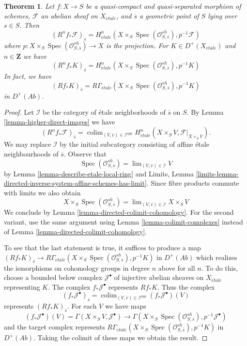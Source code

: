 \documentclass[10pt,a4paper]{amsart}
\theoremstyle{plain}
\newtheorem{theorem}[subsection]{Theorem}
\theoremstyle{definition}
\theoremstyle{remark}
\numberwithin{equation}{subsection}
\def\lim{\mathop{\mathrm{lim}}\nolimits}
\def\colim{\mathop{\mathrm{colim}}\nolimits}
\def\Spec{\mathop{\mathrm{Spec}}}
\def\etale{{\acute{e}tale}}
\begin{document}
\begin{theorem}
\label{theorem-higher-direct-images}
Let $f: X \to S$ be a quasi-compact and quasi-separated morphism of schemes,
$\mathcal{F}$ an abelian sheaf on $X_\etale$, and $\overline{s}$ a
geometric point of $S$ lying over $s \in S$. Then
$$
\left(R^nf_* \mathcal{F}\right)_{\overline{s}} =
H_\etale^n( X \times_S \Spec(\mathcal{O}_{S, \overline{s}}^{sh}),
p^{-1}\mathcal{F})
$$
where $p : X \times_S \Spec(\mathcal{O}_{S, \overline{s}}^{sh}) \to X$
is the projection. For $K \in D^+(X_\etale)$ and $n \in \mathbf{Z}$
we have
$$
\left(R^nf_*K\right)_{\overline{s}} =
H_\etale^n(X \times_S \Spec(\mathcal{O}_{S, \overline{s}}^{sh}), p^{-1}K)
$$
In fact, we have
$$
\left(Rf_*K\right)_{\overline{s}}
=
R\Gamma_\etale(X \times_S \Spec(\mathcal{O}_{S, \overline{s}}^{sh}), p^{-1}K)
$$
in $D^+(\textit{Ab})$.
\end{theorem}

\begin{proof}
Let $\mathcal{I}$ be the category of \'etale neighborhoods of $\overline{s}$
on $S$. By Lemma \ref{lemma-higher-direct-images}
we have
$$
(R^nf_*\mathcal{F})_{\overline{s}} =
\colim_{(V, \overline{v}) \in \mathcal{I}^{opp}}
H_\etale^n(X \times_S V, \mathcal{F}|_{X \times_S V}).
$$
We may replace $\mathcal{I}$ by the initial subcategory consisting
of affine \'etale neighbourhoods of $\overline{s}$. Observe that
$$
\Spec(\mathcal{O}_{S, \overline{s}}^{sh}) =
\lim_{(V, \overline{v}) \in \mathcal{I}} V
$$
by Lemma \ref{lemma-describe-etale-local-ring} and
Limits, Lemma
\ref{limits-lemma-directed-inverse-system-affine-schemes-has-limit}.
Since fibre products commute with limits we also obtain
$$
X \times_S \Spec(\mathcal{O}_{S, \overline{s}}^{sh}) =
\lim_{(V, \overline{v}) \in \mathcal{I}} X \times_S V
$$
We conclude by Lemma \ref{lemma-directed-colimit-cohomology}.
For the second variant, use the same argument using
Lemma \ref{lemma-colimit-complexes} instead of
Lemma \ref{lemma-directed-colimit-cohomology}.

\medskip\noindent
To see that the last statement is true, it suffices to produce a map
$\left(Rf_*K\right)_{\overline{s}} \to
R\Gamma_\etale(X \times_S \Spec(\mathcal{O}_{S, \overline{s}}^{sh}), p^{-1}K)$
in $D^+(\textit{Ab})$ which realizes the ismorphisms on cohomology
groups in degree $n$ above for all $n$. To do this, choose a
bounded below complex $\mathcal{J}^\bullet$ of injective abelian
sheaves on $X_\etale$ representing $K$. The complex
$f_*\mathcal{J}^\bullet$ represents $Rf_*K$. Thus the complex
$$
(f_*\mathcal{J}^\bullet)_{\overline{s}} =
\colim_{(V, \overline{v}) \in \mathcal{I}^{opp}}
(f_*\mathcal{J}^\bullet)(V)
$$
represents $(Rf_*K)_{\overline{s}}$. For each $V$ we have maps
$$
(f_*\mathcal{J}^\bullet)(V) =
\Gamma(X \times_S V, \mathcal{J}^\bullet)
\longrightarrow
\Gamma(X \times_S \Spec(\mathcal{O}_{S, \overline{s}}^{sh}),
p^{-1}\mathcal{J}^\bullet)
$$
and the target complex represents
$R\Gamma_\etale(X \times_S \Spec(\mathcal{O}_{S, \overline{s}}^{sh}), p^{-1}K)$
in $D^+(\textit{Ab})$.
Taking the colimit of these maps we obtain the result.
\end{proof}
\end{document}
